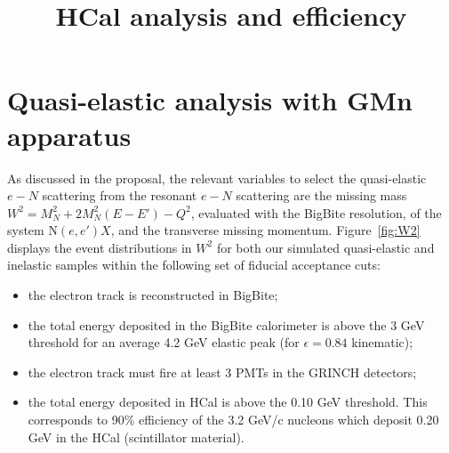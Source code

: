 \documentclass[11pt]{article}
\begin{document}
\title{HCal analysis and efficiency}

\maketitle

\section*{Quasi-elastic analysis with GMn apparatus}

As discussed in the proposal, the relevant variables to select the quasi-elastic $e-N$ scattering from the resonant $e-N$ scattering are the missing mass $W^2 = M_{N}^2+2M_{N}^{2}(E-E')-Q^2$, evaluated with the BigBite resolution, of the system N$(e, e')X$, and the transverse missing momentum.
Figure~\ref{fig:W2} displays the event distributions in $W^2$ for both our simulated quasi-elastic and inelastic samples within the following set of fiducial acceptance cuts:
%
\begin{itemize}
\item{the electron track is reconstructed in BigBite;}
\item{the total energy deposited in the BigBite calorimeter is above the 3 GeV threshold for an average 4.2 GeV elastic peak (for $\epsilon = 0.84$ kinematic);}
\item{the electron track must fire at least 3 PMTs in the GRINCH detectors;}
\item{the total energy deposited in HCal is above the 0.10 GeV threshold. This corresponds to 90\% efficiency of the 3.2 GeV/c nucleons which deposit 0.20 GeV in the HCal (scintillator material).}
\end{itemize}
%
%
\end{document}
